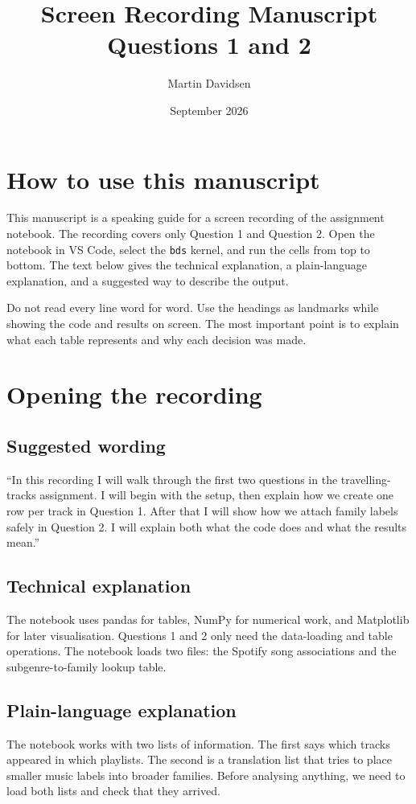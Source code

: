 \documentclass[11pt,a4paper]{article}
\title{Screen Recording Manuscript\\Questions 1 and 2}
\author{Martin Davidsen}
\date{September 2026}
\begin{document}
\maketitle

\section*{How to use this manuscript}
This manuscript is a speaking guide for a screen recording of the assignment notebook. The recording covers only Question 1 and Question 2. Open the notebook in VS Code, select the \texttt{bds} kernel, and run the cells from top to bottom. The text below gives the technical explanation, a plain-language explanation, and a suggested way to describe the output.

Do not read every line word for word. Use the headings as landmarks while showing the code and results on screen. The most important point is to explain what each table represents and why each decision was made.

\section{Opening the recording}

\subsection*{Suggested wording}
``In this recording I will walk through the first two questions in the travelling-tracks assignment. I will begin with the setup, then explain how we create one row per track in Question 1. After that I will show how we attach family labels safely in Question 2. I will explain both what the code does and what the results mean.''

\subsection*{Technical explanation}
The notebook uses pandas for tables, NumPy for numerical work, and Matplotlib for later visualisation. Questions 1 and 2 only need the data-loading and table operations. The notebook loads two files: the Spotify song associations and the subgenre-to-family lookup table.

\subsection*{Plain-language explanation}
The notebook works with two lists of information. The first says which tracks appeared in which playlists. The second is a translation list that tries to place smaller music labels into broader families. Before analysing anything, we need to load both lists and check that they arrived.
\end{document}
